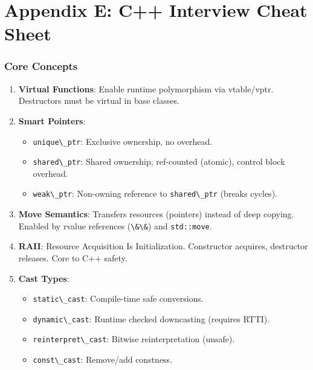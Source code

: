 \hypertarget{appendix-e-c-interview-cheat-sheet}{%
\section{Appendix E: C++ Interview Cheat
Sheet}\label{appendix-e-c-interview-cheat-sheet}}

\hypertarget{core-concepts}{%
\subsubsection{Core Concepts}\label{core-concepts}}

\begin{enumerate}
\def\labelenumi{\arabic{enumi}.}
\tightlist
\item
  \textbf{Virtual Functions}: Enable runtime polymorphism via
  vtable/vptr. Destructors must be virtual in base classes.
\item
  \textbf{Smart Pointers}:

  \begin{itemize}
  \tightlist
  \item
    \passthrough{\lstinline!unique\_ptr!}: Exclusive ownership, no
    overhead.
  \item
    \passthrough{\lstinline!shared\_ptr!}: Shared ownership, ref-counted
    (atomic), control block overhead.
  \item
    \passthrough{\lstinline!weak\_ptr!}: Non-owning reference to
    \passthrough{\lstinline!shared\_ptr!} (breaks cycles).
  \end{itemize}
\item
  \textbf{Move Semantics}: Transfers resources (pointers) instead of
  deep copying. Enabled by rvalue references
  (\passthrough{\lstinline!\&\&!}) and
  \passthrough{\lstinline!std::move!}.
\item
  \textbf{RAII}: Resource Acquisition Is Initialization. Constructor
  acquires, destructor releases. Core to C++ safety.
\item
  \textbf{Cast Types}:

  \begin{itemize}
  \tightlist
  \item
    \passthrough{\lstinline!static\_cast!}: Compile-time safe
    conversions.
  \item
    \passthrough{\lstinline!dynamic\_cast!}: Runtime checked downcasting
    (requires RTTI).
  \item
    \passthrough{\lstinline!reinterpret\_cast!}: Bitwise
    reinterpretation (unsafe).
  \item
    \passthrough{\lstinline!const\_cast!}: Remove/add constness.
  \end{itemize}
\end{enumerate}

